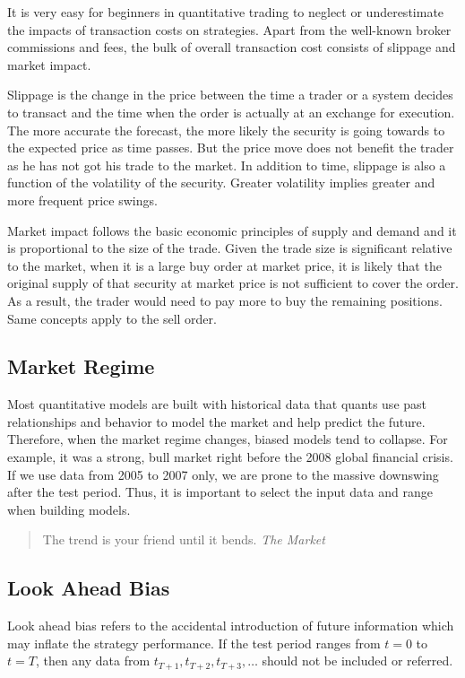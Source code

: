\documentclass[12pt]{article}
\begin{document}
It is very easy for beginners in quantitative trading to neglect or underestimate the impacts of transaction costs on strategies. Apart from the well-known broker commissions and fees, the bulk of overall transaction cost consists of slippage and market impact.

Slippage is the change in the price between the time a trader or a system decides to transact and the time when the order is actually at an exchange for execution. The more accurate the forecast, the more likely the security is going towards to the expected price as time passes. But the price move does not benefit the trader as he has not got his trade to the market. In addition to time, slippage is also a function of the volatility of the security. Greater volatility implies greater and more frequent price swings.

Market impact follows the basic economic principles of supply and demand and it is proportional to the size of the trade. Given the trade size is significant relative to the market, when it is a large buy order at market price, it is likely that the original supply of that security at market price is not sufficient to cover the order. As a result, the trader would need to pay more to buy the remaining positions. Same concepts apply to the sell order.

\subsection{Market Regime}

Most quantitative models are built with historical data that quants use past relationships and behavior to model the market and help predict the future. Therefore, when the market regime changes, biased models tend to collapse. For example, it was a strong, bull market right before the 2008 global financial crisis. If we use data from 2005 to 2007 only, we are prone to the massive downswing after the test period. Thus, it is important to select the input data and range when building models.

\begin{quote}
  The trend is your friend until it bends.
  \textit{The Market}
\end{quote}

\subsection{Look Ahead Bias}

Look ahead bias refers to the accidental introduction of future information which may inflate the strategy performance. If the test period ranges from $t=0$ to $t=T$, then any data from $t_{T+1}, t_{T+2}, t_{T+3}, \dots$ should not be included or referred.
\end{document}
